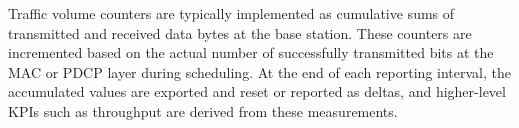 Traffic volume counters are typically implemented as cumulative sums of transmitted and received data bytes at the base station. These counters are incremented based on the actual number of successfully transmitted bits at the MAC or PDCP layer during scheduling. At the end of each reporting interval, the accumulated values are exported and reset or reported as deltas, and higher-level KPIs such as throughput are derived from these measurements. \\



